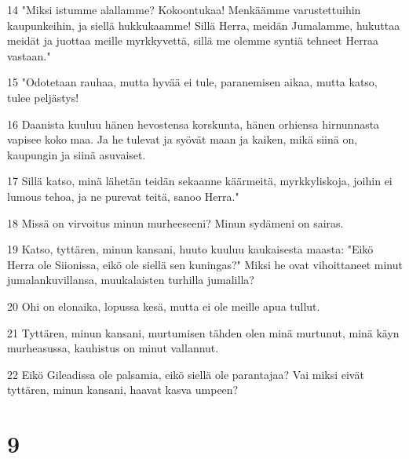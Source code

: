 \par 14 "Miksi istumme alallamme? Kokoontukaa! Menkäämme varustettuihin kaupunkeihin, ja siellä hukkukaamme! Sillä Herra, meidän Jumalamme, hukuttaa meidät ja juottaa meille myrkkyvettä, sillä me olemme syntiä tehneet Herraa vastaan."
\par 15 "Odotetaan rauhaa, mutta hyvää ei tule, paranemisen aikaa, mutta katso, tulee peljästys!
\par 16 Daanista kuuluu hänen hevostensa korskunta, hänen orhiensa hirnunnasta vapisee koko maa. Ja he tulevat ja syövät maan ja kaiken, mikä siinä on, kaupungin ja siinä asuvaiset.
\par 17 Sillä katso, minä lähetän teidän sekaanne käärmeitä, myrkkyliskoja, joihin ei lumous tehoa, ja ne purevat teitä, sanoo Herra."
\par 18 Missä on virvoitus minun murheeseeni? Minun sydämeni on sairas.
\par 19 Katso, tyttären, minun kansani, huuto kuuluu kaukaisesta maasta: "Eikö Herra ole Siionissa, eikö ole siellä sen kuningas?" Miksi he ovat vihoittaneet minut jumalankuvillansa, muukalaisten turhilla jumalilla?
\par 20 Ohi on elonaika, lopussa kesä, mutta ei ole meille apua tullut.
\par 21 Tyttären, minun kansani, murtumisen tähden olen minä murtunut, minä käyn murheasussa, kauhistus on minut vallannut.
\par 22 Eikö Gileadissa ole palsamia, eikö siellä ole parantajaa? Vai miksi eivät tyttären, minun kansani, haavat kasva umpeen?

\chapter{9}

